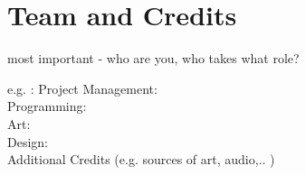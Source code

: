 \documentclass[a4paper]{scrreprt}
\begin{document}


\chapter{Team and Credits}

most important - who are you, who takes what role? 

e.g. :
Project Management: \\
Programming: \\ 
Art: \\ 
Design: \\ 

Additional Credits (e.g. sources of art, audio,.. ) 


%
%
\end{document}
